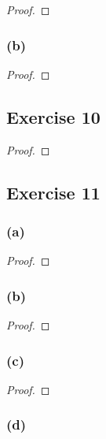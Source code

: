 \documentclass[14pt]{extarticle}
\begin{document}
\begin{proof}

\end{proof}

\subsubsection{(b)}

\begin{proof}

\end{proof}

\subsection{Exercise 10}

\begin{proof}

\end{proof}

\subsection{Exercise 11}

\subsubsection{(a)}

\begin{proof}

\end{proof}

\subsubsection{(b)}

\begin{proof}

\end{proof}

\subsubsection{(c)}

\begin{proof}

\end{proof}

\subsubsection{(d)}
\end{document}
